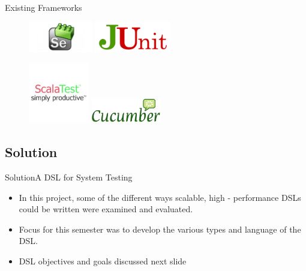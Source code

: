 \documentclass{beamer}
\begin{document}
\begin{frame}{Existing Frameworks}
\begin{figure}[h!]
  \centering
    \includegraphics[height=50px]{figures/selenium.jpg}
    \includegraphics[height=50px]{figures/junit-logo.png}
\end{figure}
\begin{figure}[h!]
  \centering
    \includegraphics[height=100px]{figures/scalaTest.jpg}
    \includegraphics[height=40px]{figures/cucumber.png}
\end{figure}
\end{frame}


\subsection{Solution}
\begin{frame}{Solution}{A DSL for System Testing}
  \begin{itemize}
  \item {
    In this project, some of the different ways scalable, high - performance DSLs could be written were examined and evaluated.
  }
  \item {
    Focus for this semester was to develop the various types and language of the DSL.
  }
  \item {
  DSL objectives and goals discussed next slide
  }
  \end{itemize}
\end{frame}
\end{document}
